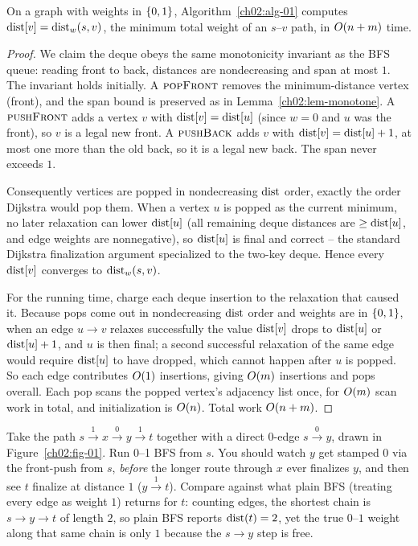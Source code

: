\begin{theorem}
\label{ch02:thm-01}
On a graph with weights in $\{0,1\}$, Algorithm~\ref{ch02:alg-01} computes
$\operatorname{dist}[v]=\operatorname{dist}_w(s,v)$, the minimum total weight of an $s$--$v$ path, in
$O(n+m)$ time.
\end{theorem}

\begin{proof}
We claim the deque obeys the same monotonicity invariant as the BFS queue:
reading front to back, distances are nondecreasing and span at most $1$. The
invariant holds initially. A $\textsc{popFront}$ removes the minimum-distance
vertex (front), and the span bound is preserved as in
Lemma~\ref{ch02:lem-monotone}. A $\textsc{pushFront}$ adds a vertex $v$ with
$\operatorname{dist}[v]=\operatorname{dist}[u]$ (since $w=0$ and $u$ was the front), so $v$ is a legal new
front. A $\textsc{pushBack}$ adds $v$ with $\operatorname{dist}[v]=\operatorname{dist}[u]+1$, at most one more
than the old back, so it is a legal new back. The span never exceeds $1$.

Consequently vertices are popped in nondecreasing $\operatorname{dist}$ order, exactly the
order Dijkstra would pop them. When a vertex $u$ is popped as the current
minimum, no later relaxation can lower $\operatorname{dist}[u]$ (all remaining deque distances
are $\ge\operatorname{dist}[u]$, and edge weights are nonnegative), so $\operatorname{dist}[u]$ is final and
correct -- the standard Dijkstra finalization argument specialized to the
two-key deque. Hence every $\operatorname{dist}[v]$ converges to $\operatorname{dist}_w(s,v)$.

For the running time, charge each deque insertion to the relaxation that caused
it. Because pops come out in nondecreasing $\operatorname{dist}$ order and weights are in
$\{0,1\}$, when an edge $u\to v$ relaxes successfully the value $\operatorname{dist}[v]$ drops
to $\operatorname{dist}[u]$ or $\operatorname{dist}[u]+1$, and $u$ is then final; a second successful
relaxation of the same edge would require $\operatorname{dist}[u]$ to have dropped, which cannot
happen after $u$ is popped. So each edge contributes $O(1)$ insertions, giving
$O(m)$ insertions and pops overall. Each pop scans the popped vertex's
adjacency list once, for $O(m)$ scan work in total, and initialization is
$O(n)$. Total work $O(n+m)$.
\end{proof}

\begin{labbox}
Take the path $s\xrightarrow{1} x \xrightarrow{0} y \xrightarrow{1} t$ together
with a direct $0$-edge $s\xrightarrow{0} y$, drawn in
Figure~\ref{ch02:fig-01}. Run 0--1 BFS from $s$. You should
watch $y$ get stamped $0$ via the front-push from $s$, \emph{before} the longer
route through $x$ ever finalizes $y$, and then see $t$ finalize at distance $1$
($y\xrightarrow{1}t$). Compare against what plain BFS (treating every edge as
weight $1$) returns for $t$: counting edges, the shortest chain is
$s\to y\to t$ of length $2$, so plain BFS reports $\operatorname{dist}(t)=2$, yet the true
$0$--$1$ weight along that same chain is only $1$ because the $s\to y$ step is
free.
\end{labbox}

